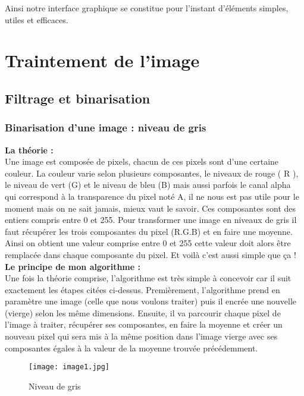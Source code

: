 \documentclass{article}
\begin{document}
Ainsi notre interface graphique se constitue pour l’instant d’éléments simples, utiles
et efficaces.


      \section{Traintement de l'image }
              \subsection{Filtrage et binarisation }
                          \subsubsection {Binarisation d'une image : niveau de gris}

\textbf{La théorie :}\\
Une image est composée de pixels, chacun de ces pixels sont d’une certaine couleur. La couleur varie selon plusieurs composantes, le niveaux de rouge ( R ), le niveau de vert (G) et le niveau de bleu (B) mais aussi parfois le canal alpha qui correspond à la transparence du pixel noté A, il ne nous est pas utile pour le moment mais on ne sait jamais, mieux vaut le savoir. Ces composantes sont des entiers compris entre 0 et 255. Pour transformer une image en niveaux de gris il faut récupérer les trois composantes du pixel (R.G.B) et en faire une moyenne. Ainsi on obtient une valeur comprise entre 0 et 255 cette valeur doit alors être remplacée dans chaque composante du pixel. Et voilà c’est aussi simple que ça !
\\

\textbf{Le principe de mon algorithme :} \\
Une fois la théorie comprise, l’algorithme est très simple à concevoir car il suit exactement les étapes citées ci-dessus. Premièrement, l’algorithme prend en paramètre une image (celle que nous voulons traiter) puis il encrée une nouvelle (vierge) selon les même dimensions. Ensuite, il va parcourir chaque pixel de l’image à traiter, récupérer ses composantes, en faire la moyenne et créer un  nouveau pixel qui sera mis à la même position dans l’image vierge avec ses composantes égales à la valeur de la moyenne trouvée précédemment.
\newpage
\\
    \begin{figure}[hp]
	    \centering
	    \texttt{[image: image1.jpg]}
	    \caption{Niveau de gris}
    \end{figure}
\\
\end{document}
